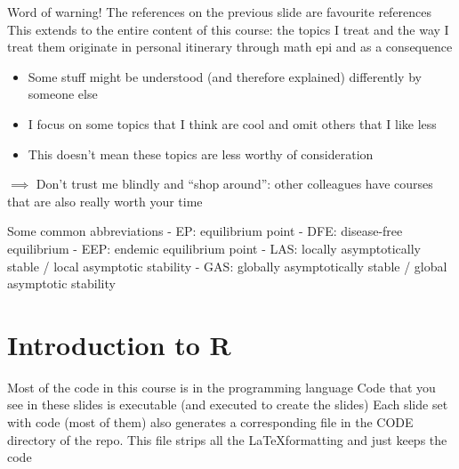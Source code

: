 \documentclass[aspectratio=169]{beamer}\usepackage[]{graphicx}\usepackage[]{xcolor}
\begin{document}
\begin{frame}{Word of warning!}
	The references on the previous slide are  favourite references
	\vfill
	This extends to the entire content of this course: the topics I treat and the way I treat them originate in  personal itinerary through math epi and as a consequence
	\begin{itemize}
		\item Some stuff might be understood (and therefore explained) differently by someone else
		\item I focus on some topics that I think are cool and omit others that I like less
		\item This doesn't mean these topics are less worthy of consideration
	\end{itemize}
	\vfill
	$\implies$ Don't trust me blindly and ``shop around'': other colleagues have courses that are also really worth your time
\end{frame}

\begin{frame}{Some common abbreviations}
- EP: equilibrium point
\vfill
- DFE: disease-free equilibrium
\vfill
- EEP: endemic equilibrium point
\vfill
- LAS: locally asymptotically stable / local asymptotic stability
\vfill
- GAS: globally asymptotically stable / global asymptotic stability
\end{frame}

\section{Introduction to R}


\begin{frame}
	Most of the code in this course is in the  programming language
	\vfill
	Code that you see in these slides is executable (and executed to create the slides)
	\vfill
	Each slide set with code (most of them) also generates a corresponding  file in the CODE directory of the repo. This file strips all the \LaTeX formatting and just keeps the  code
\end{frame}
\end{document}

